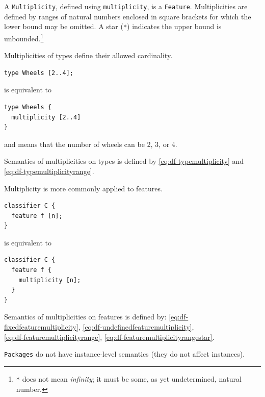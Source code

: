 


\pn A \texttt{Multiplicity}, defined using \texttt{multiplicity}, is a \texttt{Feature}.  Multiplicities are defined by ranges of natural numbers enclosed in square brackets for which the lower bound may be omitted.  A star (\texttt{*}) indicates the upper bound is unbounded.\footnote{\texttt{*} does not mean \emph{infinity}; it must be some, as yet undetermined, natural number.}

\pn Multiplicities of types define their allowed cardinality.

\begin{lstlisting}
type Wheels [2..4];
\end{lstlisting}
is equivalent to
\begin{lstlisting}
type Wheels {
  multiplicity [2..4]
}
\end{lstlisting}
and means that the number of wheels can be 2, 3, or 4.

\pn Semantics of multiplicities on types is defined by \ref{eq:df-typemultiplicity} and  \ref{eq:df-typemultiplicityrange}.

\pn Multiplicity is more commonly applied to features.

\begin{lstlisting}
classifier C {
  feature f [n];
}
\end{lstlisting}
is equivalent to 
\begin{lstlisting}
classifier C {
  feature f {
    multiplicity [n];
  }
}
\end{lstlisting}

\pn Semantics of multiplicities on features is defined by:  \ref{eq:df-fixedfeaturemultiplicity}, \ref{eq:df-undefinedfeaturemultiplicity},\\ \ref{eq:df-featuremultiplicityrange}, \ref{eq:df-featuremultiplicityrangestar}.




\pn \texttt{Packages} do not have instance-level semantics (they do not affect instances).



